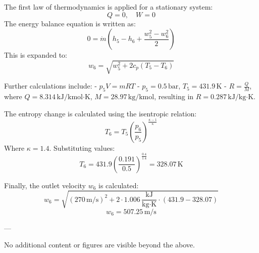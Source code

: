 The first law of thermodynamics is applied for a stationary system:  
\[
Q = 0, \quad W = 0
\]  
The energy balance equation is written as:  
\[
0 = \dot{m} \left( h_5 - h_6 + \frac{w_5^2 - w_6^2}{2} \right)
\]  
This is expanded to:  
\[
w_6 = \sqrt{w_5^2 + 2 c_p (T_5 - T_6)}
\]  

Further calculations include:  
- \( p_5 V = m R T \)  
- \( p_5 = 0.5 \, \text{bar} \), \( T_5 = 431.9 \, \text{K} \)  
- \( R = \frac{Q}{M} \), where \( Q = 8.314 \, \text{kJ/kmol·K} \), \( M = 28.97 \, \text{kg/kmol} \), resulting in \( R = 0.287 \, \text{kJ/kg·K} \).  

The entropy change is calculated using the isentropic relation:  
\[
T_6 = T_5 \left( \frac{p_6}{p_5} \right)^{\frac{\kappa - 1}{\kappa}}
\]  
Where \( \kappa = 1.4 \). Substituting values:  
\[
T_6 = 431.9 \left( \frac{0.191}{0.5} \right)^{\frac{0.4}{1.4}} = 328.07 \, \text{K}
\]  

Finally, the outlet velocity \( w_6 \) is calculated:  
\[
w_6 = \sqrt{(270 \, \text{m/s})^2 + 2 \cdot 1.006 \, \frac{\text{kJ}}{\text{kg·K}} \cdot (431.9 - 328.07)}
\]  
\[
w_6 = 507.25 \, \text{m/s}
\]  

---

No additional content or figures are visible beyond the above.